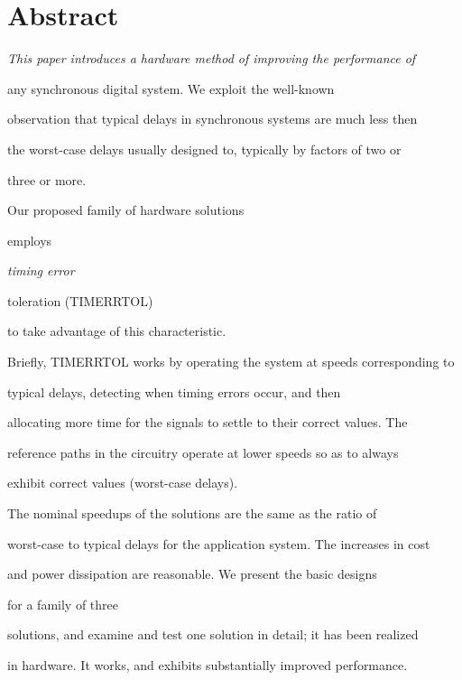 \documentclass[12pt,dvips]{article}
\begin{document}




\vspace{-0.35in}

 

\section*{\centering Abstract}

{\em This paper introduces a hardware method of improving the performance of

any synchronous digital system. We exploit the well-known

observation that typical delays in synchronous systems are much less then

the worst-case delays usually designed to, typically by factors of two or

three or more.

Our proposed family of hardware solutions

employs {\it timing error

toleration (TIMERRTOL)} to take advantage of this characteristic.

Briefly, TIMERRTOL works by operating the system at speeds corresponding to

typical delays, detecting when timing errors occur, and then 

allocating more time for the signals to settle to their correct values. The

reference paths in the circuitry operate at lower speeds so as to always

exhibit correct values (worst-case delays).

The nominal speedups of the solutions are the same as the ratio of

worst-case to typical delays for the application system. The increases in cost

and power dissipation are reasonable. We present the basic designs

for a family of three

solutions, and examine and test one solution in detail; it has been realized

in hardware. It works, and exhibits substantially improved performance.

}
\end{document}
